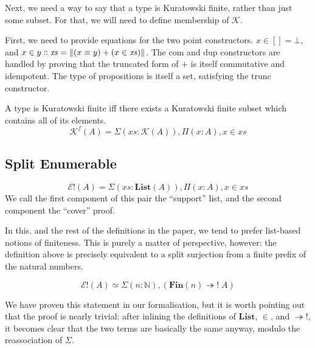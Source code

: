 Next, we need a way to say that a type is Kuratowski finite, rather than just
some subset.
For that, we will need to define membership of \(\mathcal{K}\).
\begin{rm-definition}
  First, we need to provide equations for the two point constructors.
  \(x \in [] = \bot\), and \(x \in y \dblcolon \mathit{xs} = \lVert (x \equiv y)
  + (x \in \mathit{xs}) \rVert \).
  The \(\text{com}\) and \(\text{dup}\) constructors are handled by proving that
  the truncated form of \(+\) is itself commutative and idempotent.
  The type of propositions is itself a set, satisfying the \(\text{trunc}\)
  constructor.
\end{rm-definition}
\begin{rm-definition}
  A type is Kuratowski finite iff there exists a Kuratowski finite subset which
  contains all of its elements.
  \begin{equation}
    \mathcal{K}^{f}(A) = \Sigma {(\mathit{xs} : \mathcal{K}(A))} , \Pi (x : A) , x \in \mathit{xs}
  \end{equation}
\end{rm-definition}



\subsection{Split Enumerable}
\begin{rm-definition}
  \begin{equation}
    \mathcal{E}!(A) = \Sigma {(\mathit{xs} : \textbf{List}(A))} , \Pi {(x : A)} , x \in xs
  \end{equation}
  We call the first component of this pair the ``support'' list, and the second
  component the ``cover'' proof.
\end{rm-definition}
In this, and the rest of the definitions in the paper, we tend to prefer
list-based notions of finiteness.
This is purely a matter of perspective, however: the definition above is
precisely equivalent to a split surjection from a finite prefix of the natural
numbers.
\begin{rm-lemma}
  \begin{equation}
    \mathcal{E}!(A) \simeq \Sigma (n : \mathbb{N}) , \left( \mathbf{Fin}(n) \twoheadrightarrow ! \; A \right)
  \end{equation}
\end{rm-lemma}
We have proven this statement in our formalisation, but it is worth pointing out
that the proof is nearly trivial: after inlining the definitions of
\(\mathbf{List}\), \(\in\), and \(\twoheadrightarrow!\), it becomes clear that
the two terms are basically the same anyway, modulo the reassociation of
\(\Sigma\).

